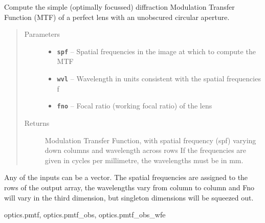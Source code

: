 \documentclass[a4paper,10pt,english]{sphinxmanual}
\begin{document}
\begin{fulllineitems}
\label{packages:optics.mtf}
Compute the simple (optimally focussed) diffraction Modulation Transfer Function (MTF) of a perfect lens with an
unobscured circular aperture.
\begin{quote}\begin{description}
\item[{Parameters}] \leavevmode\begin{itemize}
\item {} 
\textbf{\texttt{spf}} -- Spatial frequencies in the image at which to compute the MTF

\item {} 
\textbf{\texttt{wvl}} -- Wavelength in units consistent with the spatial frequencies f

\item {} 
\textbf{\texttt{fno}} -- Focal ratio (working focal ratio) of the lens

\end{itemize}

\item[{Returns}] \leavevmode
Modulation Transfer Function, with spatial frequency (spf) varying down columns and wavelength across rows
If the frequencies are given in cycles per millimetre, the wavelengths must be in mm.

\end{description}\end{quote}

Any of the inputs can be a vector. The spatial frequencies are assigned to the rows of the output array, the
wavelengths vary from column to column and Fno will vary in the third dimension, but singleton dimensions will
be squeezed out.




optics.pmtf, optics.pmtf\_obs, optics.pmtf\_obs\_wfe



\end{fulllineitems}

\end{document}
